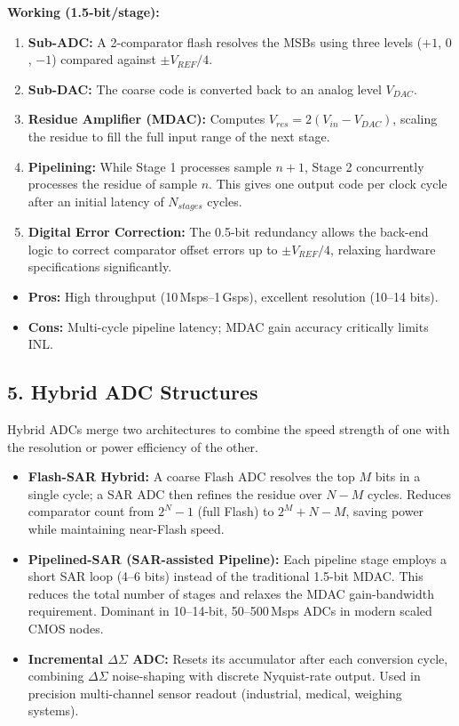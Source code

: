 \documentclass[12pt,a4paper]{article}
\begin{document}
\textbf{Working (1.5-bit/stage):}
\begin{enumerate}[label=\textbf{\arabic*.}, leftmargin=*, itemsep=3pt]
  \item \textbf{Sub-ADC:} A 2-comparator flash resolves the MSBs using three levels ($+1$, $0$, $-1$) compared against $\pm V_{REF}/4$.
  \item \textbf{Sub-DAC:} The coarse code is converted back to an analog level $V_{DAC}$.
  \item \textbf{Residue Amplifier (MDAC):} Computes $V_{res} = 2(V_{in} - V_{DAC})$, scaling the residue to fill the full input range of the next stage.
  \item \textbf{Pipelining:} While Stage 1 processes sample $n+1$, Stage 2 concurrently processes the residue of sample $n$. This gives one output code per clock cycle after an initial latency of $N_{stages}$ cycles.
  \item \textbf{Digital Error Correction:} The 0.5-bit redundancy allows the back-end logic to correct comparator offset errors up to $\pm V_{REF}/4$, relaxing hardware specifications significantly.
\end{enumerate}
\begin{itemize}[leftmargin=*, itemsep=2pt]
  \item \textbf{Pros:} High throughput (10\,Msps--1\,Gsps), excellent resolution (10--14 bits).
  \item \textbf{Cons:} Multi-cycle pipeline latency; MDAC gain accuracy critically limits INL.
\end{itemize}

\subsection{5. Hybrid ADC Structures}
Hybrid ADCs merge two architectures to combine the speed strength of one with the resolution or power efficiency of the other.

\begin{tcolorbox}[defbox, title={\textbf{Common Hybrid ADC Topologies}}]
\begin{itemize}[leftmargin=*, itemsep=4pt, topsep=0pt]
  \item \textbf{Flash-SAR Hybrid:} A coarse Flash ADC resolves the top $M$ bits in a single cycle; a SAR ADC then refines the residue over $N{-}M$ cycles. Reduces comparator count from $2^N - 1$ (full Flash) to $2^M + N - M$, saving power while maintaining near-Flash speed.
  \item \textbf{Pipelined-SAR (SAR-assisted Pipeline):} Each pipeline stage employs a short SAR loop (4--6 bits) instead of the traditional 1.5-bit MDAC. This reduces the total number of stages and relaxes the MDAC gain-bandwidth requirement. Dominant in 10--14-bit, 50--500\,Msps ADCs in modern scaled CMOS nodes.
  \item \textbf{Incremental $\Delta\Sigma$ ADC:} Resets its accumulator after each conversion cycle, combining $\Delta\Sigma$ noise-shaping with discrete Nyquist-rate output. Used in precision multi-channel sensor readout (industrial, medical, weighing systems).
\end{itemize}
\end{tcolorbox}
\end{document}
